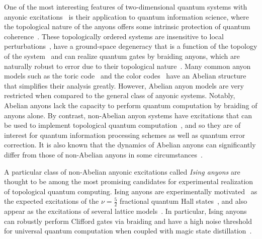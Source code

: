 \documentclass[aps, prl, letterpaper, twocolumn, superscriptaddress, notitlepage]{revtex4-1}
\begin{document}
One of the most interesting features of two-dimensional quantum systems with anyonic excitations~\cite{Wilczek1990} is their application to quantum information science, where the topological nature of the anyons offers some intrinsic protection of quantum coherence~\cite{Kitaev2003}. These topologically ordered systems are insensitive to local perturbations~\cite{Bravyi2010, *Bravyi2011a, *Michalakis2013}, have a ground-space degeneracy that is a function of the topology of the system~\cite{Wen1990, Einarsson1995} and can realize quantum gates by braiding anyons, which are naturally robust to error due to their topological nature~\cite{Kitaev2003, Nayak2008}. Many common anyon models such as the toric code~\cite{Kitaev2003} and the color codes~\cite{Bombin2006} have an Abelian structure that simplifies their analysis greatly. However, Abelian anyon models are very restricted when compared to the general class of anyonic systems. Notably, Abelian anyons lack the capacity to perform quantum computation by braiding of anyons alone. By contrast, non-Abelian anyon systems have excitations that can be used to implement topological quantum computation~\cite{Freedman2002, Freedman2002b}, and so they are of interest for quantum information processing schemes as well as quantum error correction. It is also known that the dynamics of Abelian anyons can significantly differ from those of non-Abelian anyons in some circumstances~\cite{Brennen2010, Lehman2011, Lehman2012, Zatloukal2012}.

A particular class of non-Abelian anyonic excitations called \emph{Ising anyons} are thought to be among the most promising candidates for experimental realization of topological quantum computing. Ising anyons are experimentally motivated~\cite{Willett1987} as the expected excitations of the $\nu=\frac{5}{2}$ fractional quantum Hall states~\cite{Moore1991, Nayak1996}, and also appear as the excitations of several lattice models~\cite{Kitaev2006, Levin2005a, Kapit2013, Palumbo2014}. In particular, Ising anyons can robustly perform Clifford gates via braiding and have a high noise threshold for universal quantum computation when coupled with magic state distillation~\cite{Bravyi2006b, Freedman2006}. 
\end{document}
